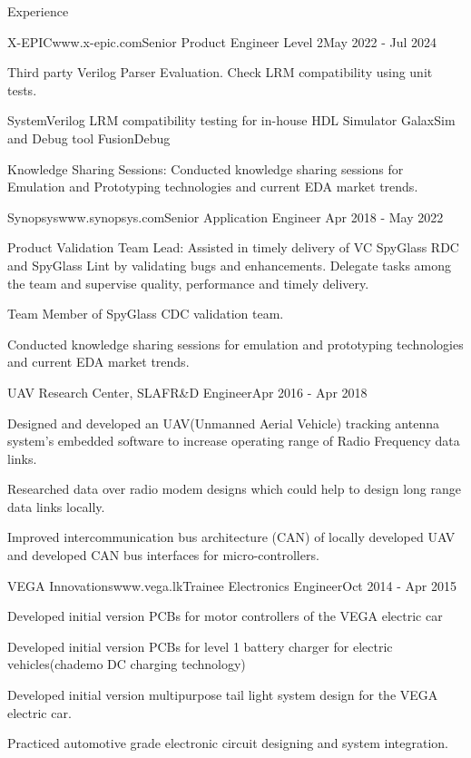 \documentclass[
11pt, %
]{./assets/resume} %
\begin{document}
\begin{rSection}{Experience}
\begin{rSubsectionX}{X-EPIC}{www.x-epic.com}{Senior Product Engineer Level 2}{May 2022 - Jul 2024}
		\item Third party Verilog Parser Evaluation. Check LRM compatibility using unit tests.
		\item SystemVerilog LRM compatibility testing for in-house HDL Simulator GalaxSim and Debug tool FusionDebug
		\item Knowledge Sharing Sessions: Conducted knowledge sharing sessions for Emulation and Prototyping technologies and current EDA market trends.
	\end{rSubsectionX}
	\begin{rSubsectionX}{Synopsys}{www.synopsys.com}{Senior Application Engineer }{Apr 2018 - May 2022}
		\item Product Validation Team Lead: Assisted in timely delivery of VC SpyGlass RDC and SpyGlass Lint by validating bugs and enhancements. Delegate tasks among the team and supervise quality, performance and timely delivery.
		\item Team Member of SpyGlass CDC validation team.
		\item Conducted knowledge sharing sessions for emulation and prototyping technologies and current EDA market trends.
	\end{rSubsectionX}
	\begin{rSubsectionX}{UAV Research Center, SLAF}{}{R\&D Engineer}{Apr 2016 - Apr 2018}
		\item Designed and developed an UAV(Unmanned Aerial Vehicle)  tracking antenna system’s embedded software to increase operating range of Radio Frequency data links. 
		\item Researched data over radio modem designs which could help to design long range data links locally. 
		\item Improved intercommunication bus architecture (CAN) of locally developed UAV and developed CAN bus interfaces for micro-controllers.
	\end{rSubsectionX}
	\begin{rSubsectionX}{VEGA Innovations}{www.vega.lk}{Trainee Electronics Engineer}{Oct 2014 - Apr 2015}
		\item Developed initial version PCBs for motor controllers of the VEGA electric car
		\item Developed initial version PCBs for level 1 battery charger for electric vehicles(chademo DC charging technology)
		\item Developed initial version multipurpose tail light system design for the VEGA electric car.
		\item Practiced automotive grade electronic circuit designing and system integration.
	\end{rSubsectionX}
	
\end{rSection}
\end{document}
